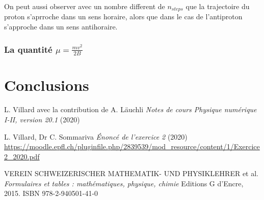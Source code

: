 \documentclass[a4paper,12pt,twoside]{article}
\begin{document}
On peut aussi observer avec un nombre different de $n_{steps}$ que la trajectoire du proton s'aprroche dans un sens horaire, alors que dans le cas de l'antiproton s'approche dans un sens antihoraire.


\subsubsection{La quantit\'e $\mu = \frac{mv^2}{2B}$}



\section{Conclusions}





\begin{thebibliography}{99}
 L. Villard avec la contribution de A. L\"auchli {\it Notes de cours Physique numérique I-II, version 20.1} (2020)
 
 L. Villard, Dr C. Sommariva {\it \'Enonc\'e de l'exercice 2} (2020)
 \url{https://moodle.epfl.ch/pluginfile.php/2839539/mod_resource/content/1/Exercice2_2020.pdf}
 
 VEREIN SCHWEIZERISCHER MATHEMATIK- UND PHYSIKLEHRER  et al. {\it Formulaires et tables : mathématiques, physique, chimie} Editions G d'Encre, 2015. ISBN 978-2-940501-41-0
 
\end{thebibliography}
\end{document}

